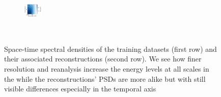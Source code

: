 \documentclass[draft]{agujournal2019}
\begin{document}
\begin{figure}[H]
\begin{minipage}{.80\linewidth}
\begin{subfigure}[t]{.9\linewidth}
\begin{center}
\end{center}

\end{subfigure}
\end{minipage}
\hspace{1.5cm}\begin{minipage}{0.01\linewidth}
\vspace{-.5cm}

\begin{subfigure}[t]{.9\linewidth}
\includegraphics[trim={9.4cm 0 0 0},clip, width=0.88cm,height=2.52cm]{figures/plots2/enatl60-0_train_psd_spacetime.png}
\end{subfigure}
\end{minipage}
\caption{
Space-time spectral densities of the training datasets (first row) and their associated reconstructions (second row). We see how finer resolution and reanalysis increase the energy levels at all scales in the while the reconstructions' PSDs are more alike but with still visible differences especially in the temporal axis} \vspace{-5mm}
\label{fig:spacetime_psd}
\end{figure}
\end{document}
